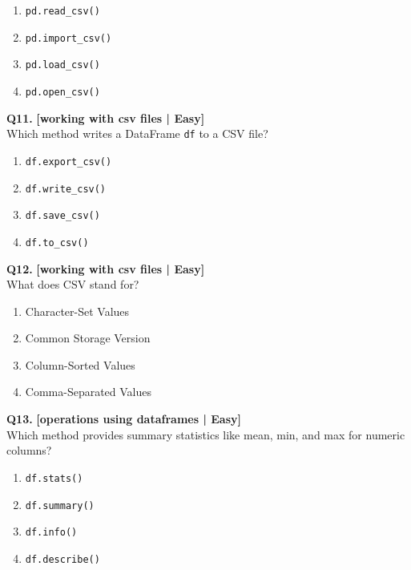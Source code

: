 \begin{enumerate}[label=(\alph*),topsep=2pt,itemsep=1pt,partopsep=0pt,parsep=0pt]
    \item \relax \texttt{pd.read\_csv()}
    \item \relax \texttt{pd.import\_csv()}
    \item \relax \texttt{pd.load\_csv()}
    \item \relax \texttt{pd.open\_csv()}
\end{enumerate}
\vspace{2mm}

\noindent\textbf{Q11.} \hfill {\small\color{LPUOrange}\textbf{[working with csv files | Easy]}}\\[2pt]
Which method writes a DataFrame \texttt{df} to a CSV file?

\begin{enumerate}[label=(\alph*),topsep=2pt,itemsep=1pt,partopsep=0pt,parsep=0pt]
    \item \relax \texttt{df.export\_csv()}
    \item \relax \texttt{df.write\_csv()}
    \item \relax \texttt{df.save\_csv()}
    \item \relax \texttt{df.to\_csv()}
\end{enumerate}
\vspace{2mm}

\noindent\textbf{Q12.} \hfill {\small\color{LPUOrange}\textbf{[working with csv files | Easy]}}\\[2pt]
What does CSV stand for?

\begin{enumerate}[label=(\alph*),topsep=2pt,itemsep=1pt,partopsep=0pt,parsep=0pt]
    \item \relax Character-Set Values
    \item \relax Common Storage Version
    \item \relax Column-Sorted Values
    \item \relax Comma-Separated Values
\end{enumerate}
\vspace{2mm}

\noindent\textbf{Q13.} \hfill {\small\color{LPUOrange}\textbf{[operations using dataframes | Easy]}}\\[2pt]
Which method provides summary statistics like mean, min, and max for numeric columns?

\begin{enumerate}[label=(\alph*),topsep=2pt,itemsep=1pt,partopsep=0pt,parsep=0pt]
    \item \relax \texttt{df.stats()}
    \item \relax \texttt{df.summary()}
    \item \relax \texttt{df.info()}
    \item \relax \texttt{df.describe()}
\end{enumerate}
\vspace{2mm}

